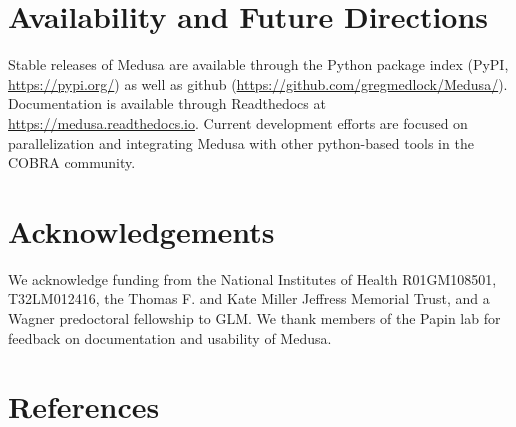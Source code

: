 \documentclass[11pt,twocolumn,notitlepage,openany,twoside]{book}
\begin{document}
\begin{refsection}
\section{Availability and Future Directions}

Stable releases of Medusa are available through the Python package index (PyPI, \url{https://pypi.org/}) as well as github (\url{https://github.com/gregmedlock/Medusa/}). Documentation is available through Readthedocs at \url{https://medusa.readthedocs.io}. Current development efforts are focused on parallelization and integrating Medusa with other python-based tools in the COBRA community.

\section{Acknowledgements}

We acknowledge funding from the National Institutes of Health R01GM108501, T32LM012416, the Thomas F. and Kate Miller Jeffress Memorial Trust, and a Wagner predoctoral fellowship to GLM. We thank members of the Papin lab for feedback on documentation and usability of Medusa.

\section{References}

\printbibliography[heading=none]
\end{refsection}

\end{document}
